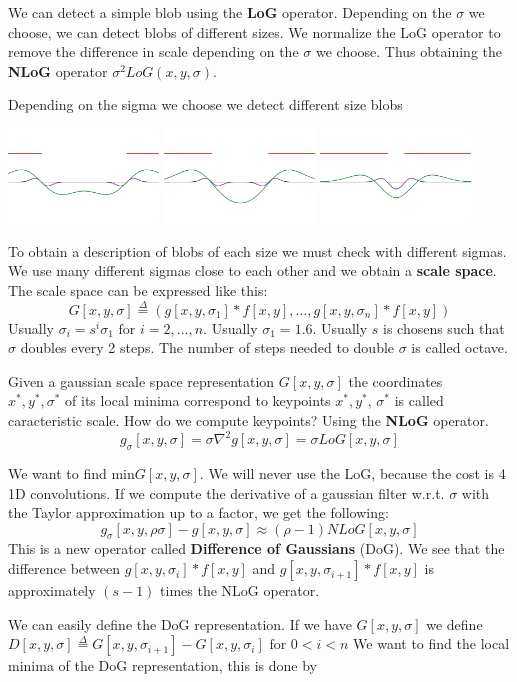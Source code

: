 We can detect a simple blob using the \textbf{LoG} operator.
Depending on the $\sigma$ we choose, we can detect blobs of different sizes.
We normalize the LoG operator to remove the difference in scale depending on the $\sigma$ we choose.
Thus obtaining the \textbf{NLoG} operator $\sigma^2 LoG(x,y,\sigma)$.

Depending on the sigma we choose we detect different size blobs

\includegraphics[width=0.3\textwidth]{assets/blob_0.png}
\includegraphics[width=0.3\textwidth]{assets/blob_1.png}
\includegraphics[width=0.3\textwidth]{assets/blob_2.png}

To obtain a description of blobs of each size we must check with different sigmas.
We use many different sigmas close to each other and we obtain a \textbf{scale space}.
The scale space can be expressed like this:
\[
    G[x,y,\sigma] \overset{\Delta}{=} (g[x,y,\sigma_1]*f[x,y], \dots, g[x,y,\sigma_n]*f[x,y])
\]
Usually $\sigma_i=s^i\sigma_1\text{ for }i=2,\dots,n$. Usually $\sigma_1=1.6$.
Usually $s$ is chosens such that $\sigma$ doubles every 2 steps. The number of steps
needed to double $\sigma$ is called octave.

Given a gaussian scale space representation $G[x,y,\sigma]$ the coordinates\\ $x^*,y^*,\sigma^*$ 
of its local minima correspond to keypoints $x^*,y^*$, $\sigma^*$ is called caracteristic scale.
How do we compute keypoints? Using the \textbf{NLoG} operator.
\[
    g_\sigma[x,y,\sigma] = \sigma\nabla^2g[x,y,\sigma] = \sigma LoG[x,y,\sigma]
\]

We want to find $\text{min}G[x,y,\sigma]$.
We will never use the LoG, because the cost is 4 1D convolutions.
If we compute the derivative of a gaussian filter w.r.t. $\sigma$ with the Taylor approximation
up to a factor, we get the following:
\[
    g_\sigma[x,y,\rho\sigma]-g[x,y,\sigma] \approx (\rho-1)NLoG[x,y,\sigma]
\]
This is a new operator called \textbf{Difference of Gaussians} (DoG).
We see that the difference between $g[x,y,\sigma_i]*f[x,y]$ and $g[x,y,\sigma_{i+1}]*f[x,y]$
is approximately $(s-1)$ times the NLoG operator.

We can easily define the DoG representation. 
If we have $G[x,y,\sigma]$ we define 
$D[x,y,\sigma] \overset{\Delta}{=} G[x,y,\sigma_{i+1}]-G[x,y,\sigma_i]\text{ for }0<i<n$
We want to find the local minima of the DoG representation, this is done by

